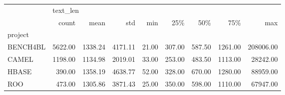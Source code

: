 \begin{tabular}{lrrrrrrrr}
\toprule
{} & \multicolumn{8}{l}{text\_len} \\
{} &    count &    mean &     std &   min &    25\% &    50\% &     75\% &       max \\
project  &          &         &         &       &        &        &         &           \\
\midrule
BENCH4BL &  5622.00 & 1338.24 & 4171.11 & 21.00 & 307.00 & 587.50 & 1261.00 & 208006.00 \\
CAMEL    &  1198.00 & 1134.98 & 2019.01 & 33.00 & 253.00 & 483.50 & 1113.00 &  28242.00 \\
HBASE    &   390.00 & 1358.19 & 4638.77 & 52.00 & 328.00 & 670.00 & 1280.00 &  88959.00 \\
ROO      &   473.00 & 1305.86 & 3871.43 & 25.00 & 350.00 & 598.00 & 1110.00 &  67947.00 \\
\bottomrule
\end{tabular}
